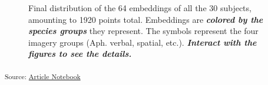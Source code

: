 \documentclass[
  authoryear]{elsarticle}
\begin{document}
\label{cell-fig-subject-embeddings-a}
\begin{figure}[H]


\caption{\label{fig-subject-embeddings-a}Final distribution of the 64
embeddings of all the 30 subjects, amounting to 1920 points total.
Embeddings are \textbf{\emph{colored by the species groups}} they
represent. The symbols represent the four imagery groups (Aph. verbal,
spatial, etc.). \textbf{\emph{Interact with the figures to see the
details.}}}

\end{figure}%

\textsubscript{Source:
\href{https://m-delem.github.io/2499-similarity-manuscript/index.qmd.html}{Article
Notebook}}
\end{document}
